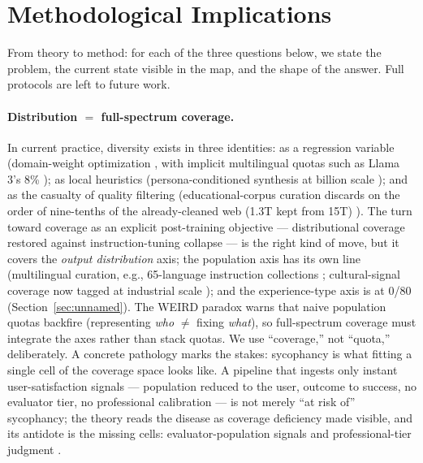 \documentclass[10pt]{article}
\begin{document}
\section{Methodological Implications}\label{sec:implications}

From theory to method: for each of the three questions below, we state the problem, the current state visible in the map, and the shape of the answer. Full protocols are left to future work.

\paragraph{Distribution $=$ full-spectrum coverage.}
In current practice, diversity exists in three identities: as a regression variable (domain-weight optimization \cite{xie2023doremi, ye2024data}, with implicit multilingual quotas such as Llama 3's 8\% \cite{grattafiori2024llama3}); as local heuristics (persona-conditioned synthesis at billion scale \cite{ge2024scaling}); and as the casualty of quality filtering (educational-corpus curation discards on the order of nine-tenths of the already-cleaned web (1.3T kept from 15T) \cite{penedo2024fineweb}). The turn toward coverage as an explicit post-training objective --- distributional coverage restored against instruction-tuning collapse \cite{sorensen2025spectrum} --- is the right kind of move, but it covers the \emph{output distribution} axis; the population axis has its own line (multilingual curation, e.g., 65-language instruction collections \cite{singh2024aya}; cultural-signal coverage now tagged at industrial scale \cite{sahu2026culturefunnel}); and the experience-type axis is at 0/80 (Section~\ref{sec:unnamed}). The WEIRD paradox \cite{zhou2025should} warns that naive population quotas backfire (representing \emph{who} $\neq$ fixing \emph{what}), so full-spectrum coverage must integrate the axes rather than stack quotas. We use ``coverage,'' not ``quota,'' deliberately. A concrete pathology marks the stakes: sycophancy is what fitting a single cell of the coverage space looks like. A pipeline that ingests only instant user-satisfaction signals --- population reduced to the user, outcome to success, no evaluator tier, no professional calibration --- is not merely ``at risk of'' sycophancy; the theory reads the disease as coverage deficiency made visible, and its antidote is the missing cells: evaluator-population signals and professional-tier judgment \cite{yu2026methodology}.
\end{document}
